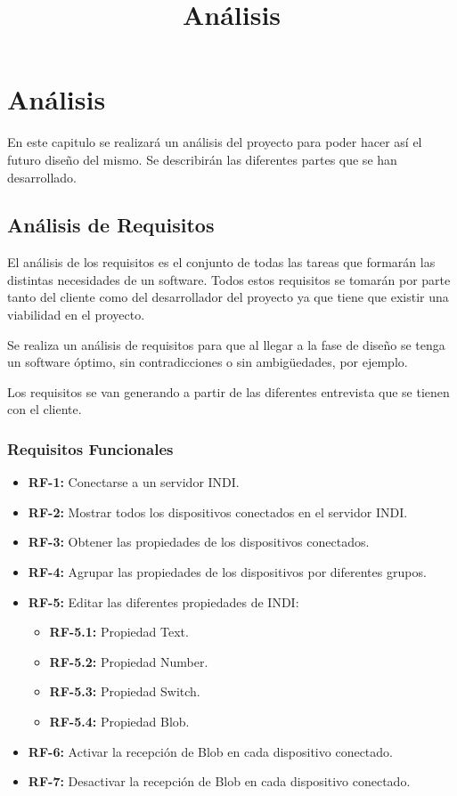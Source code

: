 \chapter{Análisis}
\title{Análisis}
\label{cap:Analisis}

En este capitulo se realizará un análisis del proyecto para poder hacer así el futuro diseño del mismo.
Se describirán las diferentes partes que se han desarrollado.

\section{Análisis de Requisitos}
El análisis de los requisitos es el conjunto de todas las tareas que formarán las distintas necesidades de un software. Todos estos requisitos se tomarán por parte tanto del cliente como del desarrollador del proyecto ya que tiene que existir una viabilidad en el proyecto.

Se realiza un análisis de requisitos para que al llegar a la fase de diseño se tenga un software óptimo, sin contradicciones o sin ambigüedades, por ejemplo.

Los requisitos se van generando a partir de las diferentes entrevista que se tienen con el cliente.

\subsection{Requisitos Funcionales}
\begin{itemize}
  \item \textbf{RF-1:} Conectarse a un servidor INDI.
  \item \textbf{RF-2:} Mostrar todos los dispositivos conectados en el servidor INDI.
  \item \textbf{RF-3:} Obtener las propiedades de los dispositivos conectados.
  \item \textbf{RF-4:} Agrupar las propiedades de los dispositivos por diferentes grupos.
  \item \textbf{RF-5:} Editar las diferentes propiedades de INDI:
  \begin{itemize}
    \item \textbf{RF-5.1:} Propiedad Text.
    \item \textbf{RF-5.2:} Propiedad Number.
    \item \textbf{RF-5.3:} Propiedad Switch.
    \item \textbf{RF-5.4:} Propiedad Blob.
  \end{itemize}
  \item \textbf{RF-6:} Activar la recepción de Blob en cada dispositivo conectado.
  \item \textbf{RF-7:} Desactivar la recepción de Blob en cada dispositivo conectado.
\end{itemize}


